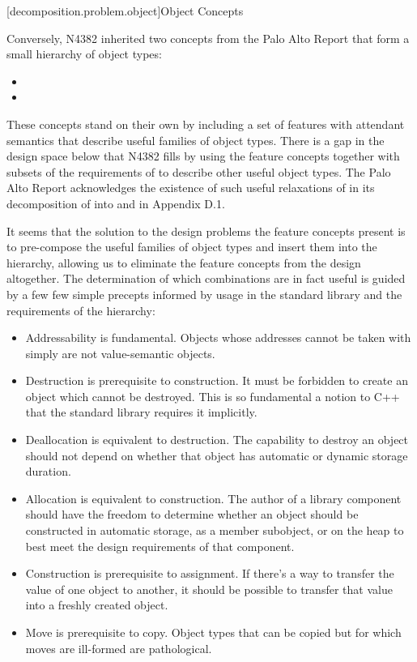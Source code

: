 [decomposition.problem.object]{Object Concepts}

\pnum
Conversely, N4382 inherited two concepts from the Palo Alto Report that form a small
hierarchy of object types:
\begin{itemize}
\item {}
\item {}
\end{itemize}
These concepts stand on their own by including a set of features with attendant semantics
that describe useful families of object types. There is a gap in the design space below
 that N4382 fills by using the feature concepts together with subsets
of the requirements of  to describe other useful object types. The Palo
Alto Report acknowledges the existence of such useful relaxations of  in
its decomposition of  into  and  in
Appendix D.1.

\pnum 
It seems that the solution to the design problems the feature concepts present is to
pre-compose the useful families of object types and insert them into the 
hierarchy, allowing us to eliminate the feature concepts from the design altogether. The
determination of which combinations are in fact useful is guided by a few few simple precepts
informed by usage in the standard library and the requirements of the  hierarchy:
\begin{itemize}
\item Addressability is fundamental. Objects whose addresses cannot be taken with \tcode{\&}
simply are not value-semantic objects. 
\item Destruction is prerequisite to construction. It must be forbidden to create an
object which cannot be destroyed. This is so fundamental a notion to C++ that the
standard library requires it implicitly.
\item Deallocation is equivalent to destruction. The capability to destroy an object should
not depend on whether that object has automatic or dynamic storage duration.
\item Allocation is equivalent to construction. The author of a library component should
have the freedom to determine whether an object should be constructed in automatic storage,
as a member subobject, or on the heap to best meet the design requirements of that component.
\item Construction is prerequisite to assignment. If there's a way to transfer the value
of one object to another, it should be possible to transfer that value into a freshly
created object.
\item Move is prerequisite to copy. Object types that can be copied but for which moves are
ill-formed are pathological.
\end{itemize}

